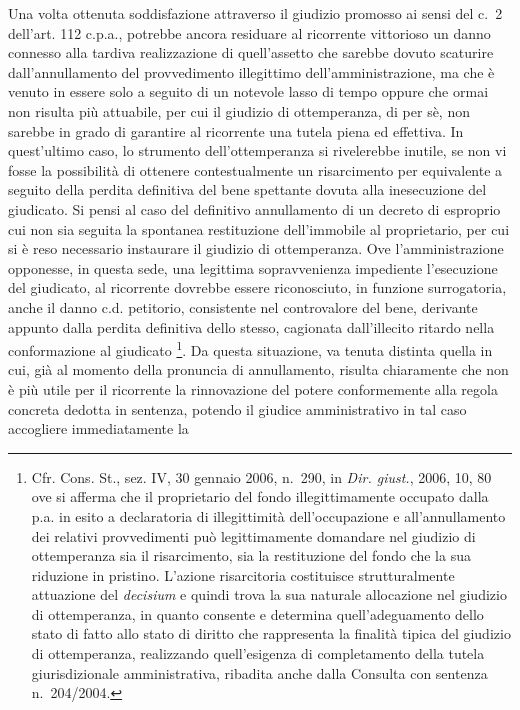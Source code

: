 \documentclass[12pt,it,a4paper,]{report}
\begin{document}
Una volta ottenuta soddisfazione attraverso il giudizio promosso ai
sensi del c.~2 dell'art. 112 c.p.a., potrebbe ancora residuare al
ricorrente vittorioso un danno connesso alla tardiva realizzazione di
quell'assetto che sarebbe dovuto scaturire dall'annullamento del
provvedimento illegittimo dell'amministrazione, ma che è venuto in
essere solo a seguito di un notevole lasso di tempo oppure che ormai non
risulta più attuabile, per cui il giudizio di ottemperanza, di per sè,
non sarebbe in grado di garantire al ricorrente una tutela piena ed
effettiva. In quest'ultimo caso, lo strumento dell'ottemperanza si
rivelerebbe inutile, se non vi fosse la possibilità di ottenere
contestualmente un risarcimento per equivalente a seguito della perdita
definitiva del bene spettante dovuta alla inesecuzione del giudicato. Si
pensi al caso del definitivo annullamento di un decreto di esproprio cui
non sia seguita la spontanea restituzione dell'immobile al proprietario,
per cui si è reso necessario instaurare il giudizio di ottemperanza. Ove
l'amministrazione opponesse, in questa sede, una legittima
sopravvenienza impediente l'esecuzione del giudicato, al ricorrente
dovrebbe essere riconosciuto, in funzione surrogatoria, anche il danno
c.d. petitorio, consistente nel controvalore del bene, derivante appunto
dalla perdita definitiva dello stesso, cagionata dall'illecito ritardo
nella conformazione al giudicato \footnote{Cfr. Cons. St., sez. IV, 30
  gennaio 2006, n.~290, in \emph{Dir. giust.}, 2006, 10, 80 ove si
  afferma che il proprietario del fondo illegittimamente occupato dalla
  p.a. in esito a declaratoria di illegittimità dell'occupazione e
  all'annullamento dei relativi provvedimenti può legittimamente
  domandare nel giudizio di ottemperanza sia il risarcimento, sia la
  restituzione del fondo che la sua riduzione in pristino. L'azione
  risarcitoria costituisce strutturalmente attuazione del
  \emph{decisium} e quindi trova la sua naturale allocazione nel
  giudizio di ottemperanza, in quanto consente e determina
  quell'adeguamento dello stato di fatto allo stato di diritto che
  rappresenta la finalità tipica del giudizio di ottemperanza,
  realizzando quell'esigenza di completamento della tutela
  giurisdizionale amministrativa, ribadita anche dalla Consulta con
  sentenza n.~204/2004.}. Da questa situazione, va tenuta distinta
quella in cui, già al momento della pronuncia di annullamento, risulta
chiaramente che non è più utile per il ricorrente la rinnovazione del
potere conformemente alla regola concreta dedotta in sentenza, potendo
il giudice amministrativo in tal caso accogliere immediatamente la
\end{document}
